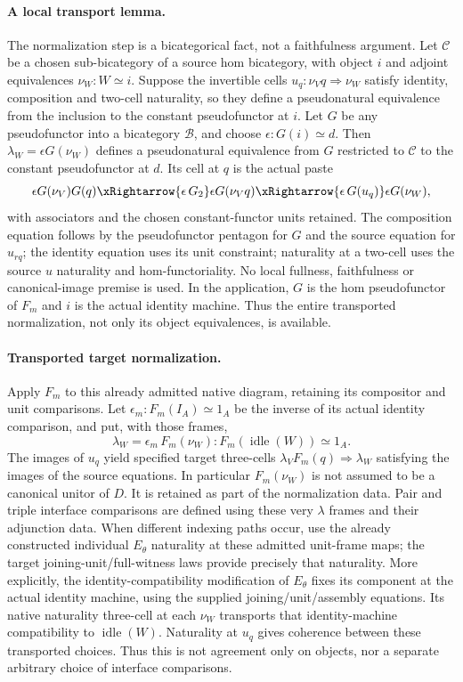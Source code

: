 \documentclass{article}
\begin{document}
\paragraph{A local transport lemma.} The normalization step is a bicategorical fact, not a faithfulness argument. Let $\mathcal C$ be a chosen sub-bicategory of a source hom bicategory, with object $i$ and adjoint equivalences $\nu_W:W\simeq i$. Suppose the invertible cells $u_q:\nu_Vq\Rightarrow\nu_W$ satisfy identity, composition and two-cell naturality, so they define a pseudonatural equivalence from the inclusion to the constant pseudofunctor at $i$. Let $G$ be any pseudofunctor into a bicategory $\mathcal B$, and choose $\epsilon:G(i)\simeq d$. Then $\lambda_W=\epsilon G(\nu_W)$ defines a pseudonatural equivalence from $G$ restricted to $\mathcal C$ to the constant pseudofunctor at $d$. Its cell at $q$ is the actual paste
\[
 \epsilon G(\nu_V)G(q)
 \xRightarrow{\epsilon\,G_2}\epsilon G(\nu_Vq)
 \xRightarrow{\epsilon\,G(u_q)}\epsilon G(\nu_W),
\]
with associators and the chosen constant-functor units retained. The composition equation follows by the pseudofunctor pentagon for $G$ and the source equation for $u_{rq}$; the identity equation uses its unit constraint; naturality at a two-cell uses the source $u$ naturality and hom-functoriality. No local fullness, faithfulness or canonical-image premise is used. In the application, $G$ is the hom pseudofunctor of $F_m$ and $i$ is the actual identity machine. Thus the entire transported normalization, not only its object equivalences, is available.

\paragraph{Transported target normalization.} Apply $F_m$ to this already admitted native diagram, retaining its compositor and unit comparisons. Let $\epsilon_m:F_m(I_A)\simeq1_A$ be the inverse of its actual identity comparison, and put, with those frames,
\[
 \lambda_W=\epsilon_m\,F_m(\nu_W):F_m(\operatorname{idle}(W))\simeq1_A.
\]
The images of $u_q$ yield specified target three-cells
$\lambda_VF_m(q)\Rightarrow\lambda_W$ satisfying the images of the source equations. In particular $F_m(\nu_W)$ is not assumed to be a canonical unitor of $D$. It is retained as part of the normalization data. Pair and triple interface comparisons are defined using these very $\lambda$ frames and their adjunction data. When different indexing paths occur, use the already constructed individual $E_\theta$ naturality at these admitted unit-frame maps; the target joining-unit/full-witness laws provide precisely that naturality. More explicitly, the identity-compatibility modification of $E_\theta$ fixes its component at the actual identity machine, using the supplied joining/unit/assembly equations. Its native naturality three-cell at each $\nu_W$ transports that identity-machine compatibility to $\operatorname{idle}(W)$. Naturality at $u_q$ gives coherence between these transported choices. Thus this is not agreement only on objects, nor a separate arbitrary choice of interface comparisons.
\end{document}
